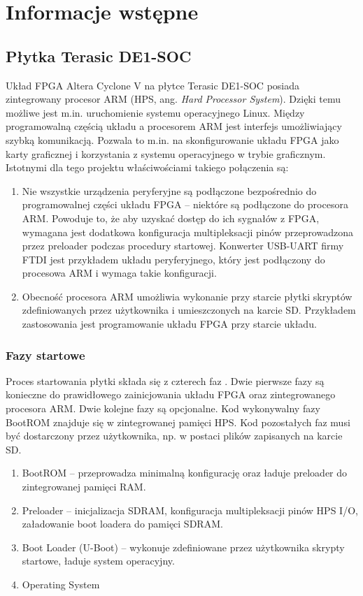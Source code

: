 \section{Informacje wstępne}
\label{sec:infornacje-wstepne}

\subsection{Płytka Terasic DE1-SOC}
Układ FPGA Altera Cyclone V na płytce Terasic DE1-SOC posiada zintegrowany procesor ARM (HPS, ang. \textit{Hard Processor System}). Dzięki temu możliwe jest m.in. uruchomienie systemu operacyjnego Linux. Między programowalną częścią układu a procesorem ARM jest interfejs umożliwiający szybką komunikacją. Pozwala to m.in. na skonfigurowanie układu FPGA jako karty graficznej i korzystania z systemu operacyjnego w trybie graficznym. Istotnymi dla tego projektu właściwościami takiego połączenia są:
\begin{enumerate}
\item Nie wszystkie urządzenia peryferyjne są podłączone bezpośrednio do programowalnej części układu FPGA -- niektóre są podłączone do procesora ARM. Powoduje to, że aby uzyskać dostęp do ich sygnałów z FPGA, wymagana jest dodatkowa konfiguracja multipleksacji pinów przeprowadzona przez preloader podczas procedury startowej. Konwerter USB-UART firmy FTDI jest przykładem układu peryferyjnego, który jest podłączony do procesowa ARM i wymaga takie konfiguracji.
\item Obecność procesora ARM umożliwia wykonanie przy starcie płytki skryptów zdefiniowanych przez użytkownika i umieszczonych na karcie SD. Przykładem zastosowania jest programowanie układu FPGA przy starcie układu.
\end{enumerate}


\subsubsection{Fazy startowe}
Proces startowania płytki składa się z czterech faz \cite[p. 1068]{altera-vol3}. Dwie pierwsze fazy są konieczne do prawidłowego zainicjowania układu FPGA oraz zintegrowanego procesora ARM. Dwie kolejne fazy są opcjonalne. Kod wykonywalny fazy BootROM znajduje się w zintegrowanej pamięci HPS. Kod pozostałych faz musi być dostarczony przez użytkownika, np. w postaci plików zapisanych na karcie SD.
\begin{enumerate}[noitemsep]
\item BootROM -- przeprowadza minimalną konfigurację oraz ładuje preloader do zintegrowanej pamięci RAM.
\item Preloader -- inicjalizacja SDRAM, konfiguracja multipleksacji pinów HPS I/O, załadowanie boot loadera do pamięci SDRAM.
\item Boot Loader (U-Boot) -- wykonuje zdefiniowane przez użytkownika skrypty startowe, ładuje system operacyjny.
\item Operating System
\end{enumerate}


